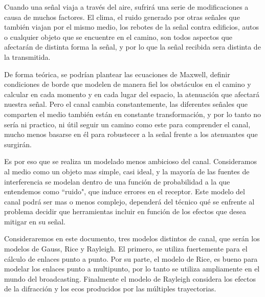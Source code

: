 Cuando una señal viaja a través del aire, sufrirá una serie de modificaciones a causa de muchos factores. El clima, el ruido generado por otras señales que también viajan por el mismo medio, los rebotes de la señal contra edificios, autos o cualquier objeto que se encuentre en el camino, son todos aspectos que afectarán de distinta forma la señal, y por lo que la señal recibida sera distinta de la transmitida. 

De forma teórica, se podrían plantear las ecuaciones de Maxwell, definir condiciones de borde que modelen de manera fiel los obstáculos en el camino y calcular en cada momento y en cada lugar del espacio, la atenuación que afectará nuestra señal. Pero el canal cambia constantemente, las diferentes señales que comparten el medio también están en constante transformación, y por lo tanto no sería ni practico, ni útil seguir un camino como este para comprender el canal, mucho menos basarse en él para robustecer a la señal frente a los atenuantes que surgirán. 

Es por eso que se realiza un modelado menos ambicioso del canal. Consideramos al medio como un objeto mas simple, casi ideal, y la mayoría de las fuentes de interferencia se modelan dentro de una función de probabilidad a la que entendemos como ``ruido", que induce errores en el receptor. Este modelo del canal podrá ser mas o menos complejo, dependerá del técnico qué se enfrente al problema decidir que herramientas incluir en función de los efectos que desea mitigar en su señal.
	
Consideraremos en este documento, tres modelos distintos de canal, que serán los modelos de Gauss, Rice y Rayleigh. El primero, se utiliza fuertemente para el cálculo de enlaces punto a punto. Por su parte, el modelo de Rice, es bueno para modelar los enlaces punto a multipunto, por lo tanto se utiliza ampliamente en el mundo del broadcasting. Finalmente el modelo de Rayleigh considera los efectos de la difracción y los ecos producidos por las múltiples trayectorias.

